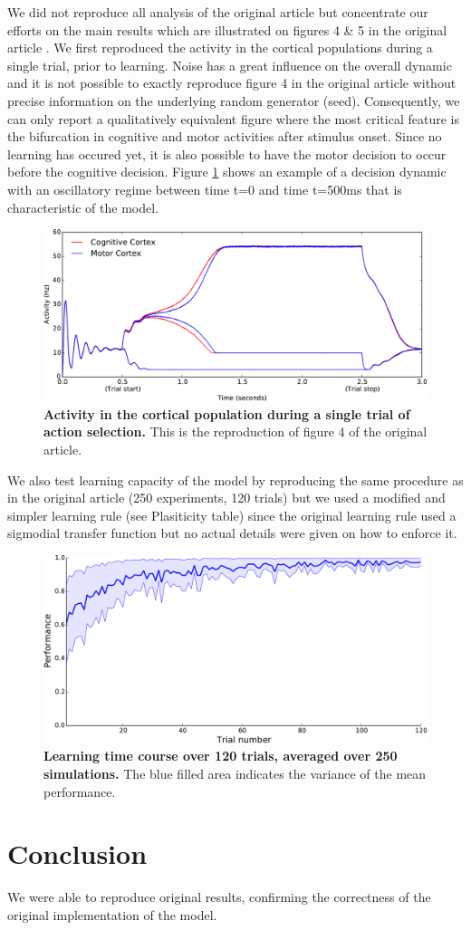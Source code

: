We did not reproduce all analysis of the original article but concentrate our
efforts on the main results which are illustrated on figures 4 \& 5 in the
original article \cite{Guthrie:2013}. We first reproduced the activity in the
cortical populations during a single trial, prior to learning. Noise has a
great influence on the overall dynamic and it is not possible to exactly
reproduce figure 4 in the original article without precise information on the
underlying random generator (seed). Consequently, we can only report a
qualitatively equivalent figure where the most critical feature is the
bifurcation in cognitive and motor activities after stimulus onset.  Since no
learning has occured yet, it is also possible to have the motor decision to
occur before the cognitive decision. Figure \ref{fig:1} shows an example of a
decision dynamic with an oscillatory regime between time t=0 and time t=500ms
that is characteristic of the model.
%
\begin{figure}[htbp]
  \centering
  \includegraphics[width=\textwidth]{./figure-1.pdf}
  \caption{\textbf{Activity in the cortical population during a single
      trial of action selection.} This is the reproduction of figure 4 of the
    original article.}
  \label{fig:1}
\end{figure}
%
We also test learning capacity of the model by reproducing the same
procedure as in the original article (250 experiments, 120 trials) but
we used a modified and simpler learning rule (see Plasiticity table)
since the original learning rule used a sigmodial transfer function but
no actual details were given on how to enforce it.
%
\begin{figure}[htbp]
  \centering
  \includegraphics[width=\textwidth]{./figure-2.pdf}
  \caption{\textbf{Learning time course over 120 trials, averaged over 250
      simulations.} The blue filled area indicates the variance of the mean
    performance.}
\end{figure}

\section* {Conclusion}

We were able to reproduce original results, confirming the correctness of the
original implementation of the model.
